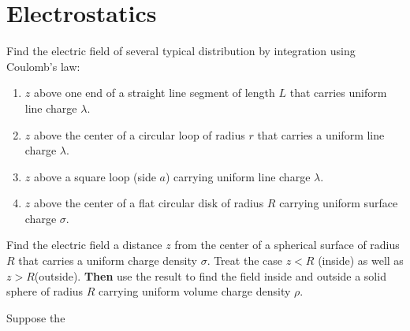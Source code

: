 \documentclass{homework}
\begin{document}

\section{Electrostatics}

\problem
Find the electric field of several typical distribution by integration using Coulomb's law: 
\begin{enumerate}
	\item $z$ above one end of a straight line segment of length $L$ that carries uniform line charge $\lambda$.
	\item $z$ above the center of a circular loop of radius $r$ that carries a uniform line charge $\lambda$.
	\item $z$ above a square loop (side $a$) carrying uniform line charge $\lambda$.
	\item $z$ above the center of a flat circular disk of radius $R$ carrying uniform surface charge $\sigma$.
\end{enumerate}

\begin{solution}
	\vspace{10em}
	\tcblower
\end{solution}

\problem
Find the electric field a distance $z$ from the center of a spherical surface
of radius $R$ that carries a uniform charge density $\sigma$. Treat the case $z<R$ (inside) as well as $z>R $(outside).
\textbf{Then} use the result to find the field inside and outside a solid sphere of radius $R$ carrying uniform volume charge density $\rho$.
\begin{solution}
	\vspace{7.5em}
	\tcblower
\end{solution}

\problem
Suppose the 
\end{document}
